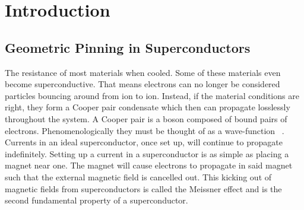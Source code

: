 \chapter{Introduction}		%
\label{introchap}

\label{section}

\section{Geometric Pinning in Superconductors}

The resistance of most materials when cooled. Some of these materials even become superconductive. That means electrons can no longer be considered particles bouncing around from ion to ion. Instead, if the material conditions are right, they form a Cooper pair condensate which then can propagate losslessly throughout the system. A Cooper pair is a boson composed of bound pairs of electrons. Phenomenologically they must be thought of as a wave-function ~\cite{Miszczak15}. Currents in an ideal superconductor, once set up, will continue to propagate indefinitely. Setting up a current in a superconductor is as simple as placing a magnet near one. The magnet will cause electrons to propagate in said magnet such that the external magnetic field is cancelled out. This kicking out of magnetic fields from superconductors is called the Meissner effect and is the second fundamental property of a superconductor.

